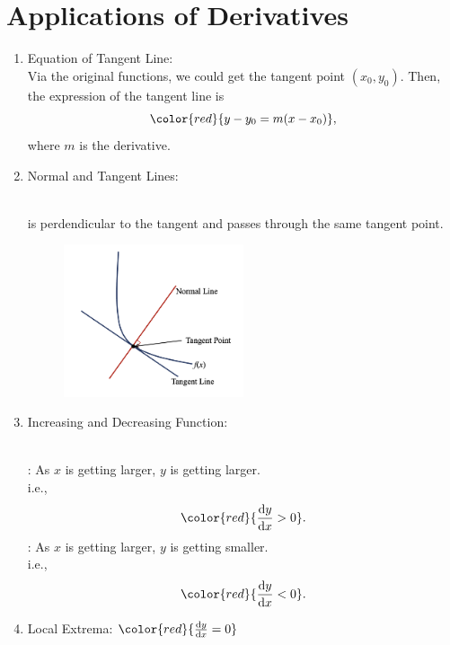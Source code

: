\documentclass[12pt, a4paper]{article}
\begin{document}
\section{Applications of Derivatives}
\begin{enumerate}
    \item Equation of Tangent Line: \\
    Via the original functions, we could get the tangent point $(x_0, y_0)$. Then, the expression of the tangent line is 
    $${\color{red}{y-y_0=m(x-x_0)}},$$ 
    where $m$ is the derivative. 
    \item Normal and Tangent Lines: 
    \begin{myclaim}{ }{}
        \\\textbf{\color{red}{Normal}} is perdendicular to the tangent and passes through the same tangent point. 
        \begin{figure}[H]
            \centering 
            \includegraphics[width=0.5\textwidth]{Fig.5.4.jpg} 
        \end{figure}
    \end{myclaim}
    \item Increasing and Decreasing Function: 
    \begin{myclaim}{ }{}
        \\\textbf{\color{red}{Increasing Function}}: As $x$ is getting larger, $y$ is getting larger.\\
        i.e., $${\color{red}{\frac{\mathrm{d}y}{\mathrm{d}x}>0}}.$$
        \textbf{\color{red}{Decreasing Function}}: As $x$ is getting larger, $y$ is getting smaller.\\
        i.e., $${\color{red}{\frac{\mathrm{d}y}{\mathrm{d}x}<0}}.$$
    \end{myclaim}
    \item Local Extrema: $\color{red}{\frac{\mathrm{d}y}{\mathrm{d}x}=0}$ {\color{red}{Stationary point}}\\
    {\color{green}{Global extrema is the maximum and the minimum points of the entire function.}}\\

\end{enumerate}
\end{document}
